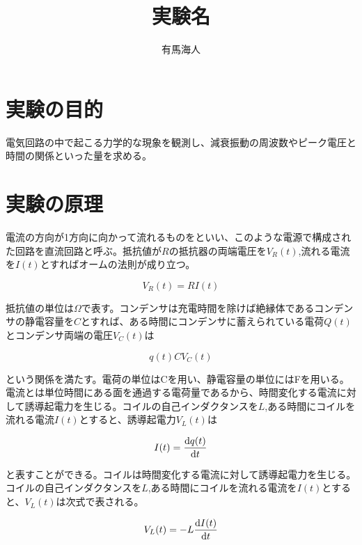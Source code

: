 \documentclass{jsarticle}
\begin{document}
\title{実験名}
\author{有馬海人}
\maketitle
    

\section{実験の目的}
    
電気回路の中で起こる力学的な現象を観測し、減衰振動の周波数やピーク電圧と時間の関係といった量を求める。
    

\section{実験の原理}
    
電流の方向が1方向に向かって流れるものをといい、このような電源で構成された回路を直流回路と呼ぶ。抵抗値が$R$の抵抗器の両端電圧を$V_R(t)$,流れる電流を$I(t)$とすればオームの法則が成り立つ。

\begin{equation}
\label{5.1}
    V_R(t) = RI(t)
\end{equation}

抵抗値の単位は$\Omega$で表す。コンデンサは充電時間を除けば絶縁体であるコンデンサの静電容量を$C$とすれば、ある時間にコンデンサに蓄えられている電荷$Q(t)$とコンデンサ両端の電圧$V_C(t)$は

\begin{equation}
\label{5.2}
    q(t) CV_C(t)
\end{equation}

という関係を満たす。電荷の単位はCを用い、静電容量の単位にはFを用いる。電流とは単位時間にある面を通過する電荷量であるから、時間変化する電流に対して誘導起電力を生じる。コイルの自己インダクタンスを$L$,ある時間にコイルを流れる電流$I(t)$とすると、誘導起電力$V_L(t)$は

\begin{equation}
\label{5.3}
    I(t) = \frac{\textrm d q(t)}{\textrm d t}
\end{equation}

と表すことができる。コイルは時間変化する電流に対して誘導起電力を生じる。コイルの自己インダクタンスを$L$,ある時間にコイルを流れる電流を$I(t)$とすると、$V_L(t)$は次式で表される。

\begin{equation}
\label{5.4}
    V_L(t) = -L\frac{\textrm d I(t)}{\textrm d t}
\end{equation}
\end{document}
